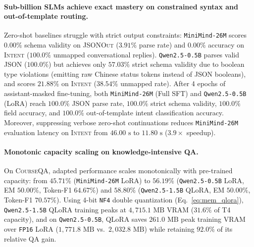 \documentclass[10pt,a4paper,twocolumn]{article}
\begin{document}
\paragraph{Sub-billion SLMs achieve exact mastery on constrained syntax and out-of-template routing.}
Zero-shot baselines struggle with strict output constraints: \texttt{MiniMind-26M} scores $0.00\%$ schema validity on \textsc{JSONOut} ($3.91\%$ parse rate) and $0.00\%$ accuracy on \textsc{Intent} ($100.0\%$ unmapped conversational replies). \texttt{Qwen2.5-0.5B} parses valid JSON ($100.0\%$) but achieves only $57.03\%$ strict schema validity due to boolean type violations (emitting raw Chinese status tokens instead of JSON booleans), and scores $21.88\%$ on \textsc{Intent} ($38.54\%$ unmapped rate). After 4 epochs of assistant-masked fine-tuning, both \texttt{MiniMind-26M} (Full SFT) and \texttt{Qwen2.5-0.5B} (LoRA) reach $100.0\%$ JSON parse rate, $100.0\%$ strict schema validity, $100.0\%$ field accuracy, and $100.0\%$ out-of-template intent classification accuracy. Moreover, suppressing verbose zero-shot continuations reduces \texttt{MiniMind-26M} evaluation latency on \textsc{Intent} from $46.00\text{ s}$ to $11.80\text{ s}$ ($3.9\times$ speedup).

\paragraph{Monotonic capacity scaling on knowledge-intensive QA.}
On \textsc{CourseQA}, adapted performance scales monotonically with pre-trained capacity: from $45.71\%$ (\texttt{MiniMind-26M} LoRA) to $56.19\%$ (\texttt{Qwen2.5-0.5B} LoRA, EM $50.00\%$, Token-F1 $64.67\%$) and $58.80\%$ (\texttt{Qwen2.5-1.5B} QLoRA, EM $50.00\%$, Token-F1 $70.57\%$). Using 4-bit \texttt{NF4} double quantization (Eq.~\ref{eq:mem_qlora}), \texttt{Qwen2.5-1.5B} QLoRA training peaks at $4,715.1\text{ MB}$ VRAM ($31.6\%$ of T4 capacity), and on \texttt{Qwen2.5-0.5B}, QLoRA saves $261.0\text{ MB}$ peak training VRAM over \texttt{FP16} LoRA ($1,771.8\text{ MB}$ vs.\ $2,032.8\text{ MB}$) while retaining $92.0\%$ of its relative QA gain.

\begin{table}[t]
\centering
{}
\caption{\textbf{Batch-1 inference quantization benchmark on \texttt{Qwen2.5-0.5B}} (\textsc{CourseQA} test split, Tesla T4).  and  denote allocated CUDA memory before and during generation.}
\label{tab:quant}
\end{table}
\end{document}
